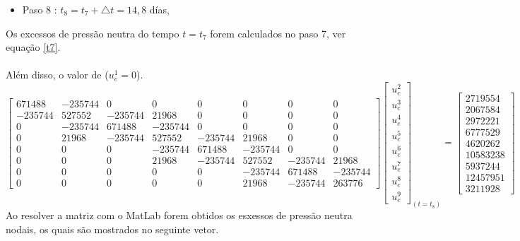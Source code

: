 \documentclass{article} %
\begin{document}
\begin{itemize}
	\item Paso 8 : \(t_8=t_7+\triangle t=14,8\) días,
\end{itemize}

Os excessos de pressão neutra do tempo \(t=t_7\) forem calculados no paso 7, ver equação \ref{t7}.\\
\\
\indent Além disso, o valor de (\(u_e^1=0\)).\\

\begin{equation*}
\begin{bmatrix}
671488& -235744& 0& 0& 0& 0& 0& 0\\
-235744&527552&-235744&21968& 0& 0& 0& 0\\
0&-235744&671488&-235744& 0& 0& 0& 0\\
0&21968&-235744&527552&-235744&21968& 0& 0\\
0&0&0& -235744&671488&-235744& 0& 0\\
0&0&0&21968&-235744&527552&-235744&21968\\
0&0&0&0&0&-235744&671488&-235744\\
0&0&0&0&0&21968&-235744&263776
\end{bmatrix}\begin{bmatrix}
u_e^2\\
u_e^3\\
u_e^4\\
u_e^5\\
u_e^6\\
u_e^7\\
u_e^8\\
u_e^9
\end{bmatrix}_{(t=t_8)}
=\begin{bmatrix}
2719554\\
2067584\\
2972221\\
6777529\\
4620262\\
10583238\\
5937244\\
12457951\\
3211928
\end{bmatrix}
\end{equation*}
\indent Ao resolver a matriz com o MatLab forem obtidos os esxessos de pressão neutra nodais, os quais são mostrados no seguinte vetor.
\end{document}
